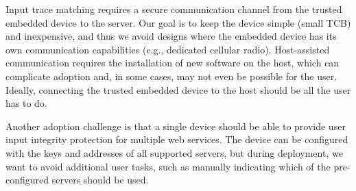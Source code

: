  Input trace matching requires a secure communication channel from the trusted embedded device to the server. Our goal is to keep the device simple (small TCB) and inexpensive, and thus we avoid designs where the embedded device has its own communication capabilities (e.g., dedicated cellular radio). Host-assisted communication requires the installation of new software on the host, which can complicate adoption and, in some cases, may not even be possible for the user. Ideally, connecting the trusted embedded device to the host should be all the user has to do.

Another adoption challenge is that a single device should be able to provide user input integrity protection for multiple web services. The device can be configured with the keys and addresses of all supported servers, but during deployment, we want to avoid additional user tasks, such as manually indicating which of the pre-configured servers should be used.


